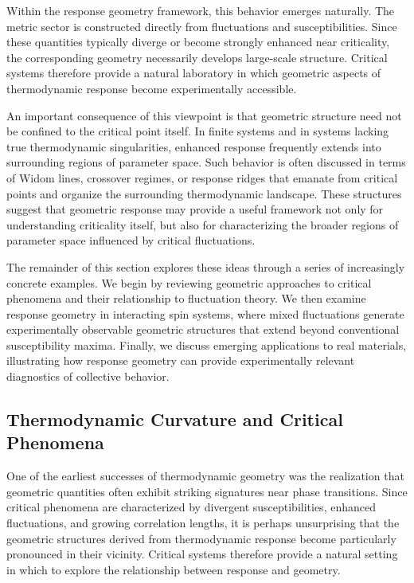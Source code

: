 Within the response geometry framework, this behavior emerges naturally. The metric sector is constructed directly from fluctuations and susceptibilities. Since these quantities typically diverge or become strongly enhanced near criticality, the corresponding geometry necessarily develops large-scale structure. Critical systems therefore provide a natural laboratory in which geometric aspects of thermodynamic response become experimentally accessible.

An important consequence of this viewpoint is that geometric structure need not be confined to the critical point itself. In finite systems and in systems lacking true thermodynamic singularities, enhanced response frequently extends into surrounding regions of parameter space. Such behavior is often discussed in terms of Widom lines, crossover regimes, or response ridges that emanate from critical points and organize the surrounding thermodynamic landscape. These structures suggest that geometric response may provide a useful framework not only for understanding criticality itself, but also for characterizing the broader regions of parameter space influenced by critical fluctuations.

The remainder of this section explores these ideas through a series of increasingly concrete examples. We begin by reviewing geometric approaches to critical phenomena and their relationship to fluctuation theory. We then examine response geometry in interacting spin systems, where mixed fluctuations generate experimentally observable geometric structures that extend beyond conventional susceptibility maxima. Finally, we discuss emerging applications to real materials, illustrating how response geometry can provide experimentally relevant diagnostics of collective behavior.



\subsection{Thermodynamic Curvature and Critical Phenomena}

One of the earliest successes of thermodynamic geometry was the realization that geometric quantities often exhibit striking signatures near phase transitions. Since critical phenomena are characterized by divergent susceptibilities, enhanced fluctuations, and growing correlation lengths, it is perhaps unsurprising that the geometric structures derived from thermodynamic response become particularly pronounced in their vicinity. Critical systems therefore provide a natural setting in which to explore the relationship between response and geometry.

